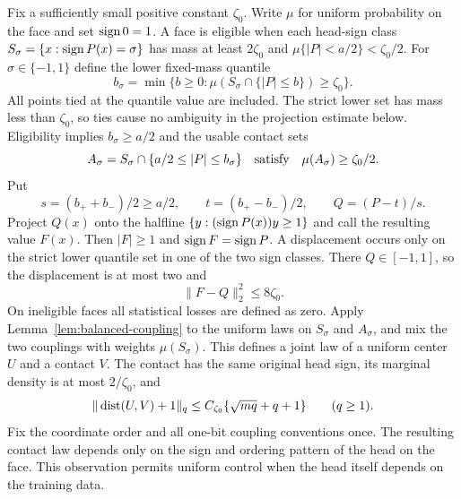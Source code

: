 Fix a sufficiently small positive constant $\zeta_0$.
Write $\mu$ for uniform probability on the face and set $\operatorname{sign}0=1$.
A face is eligible when each head-sign class
$S_\sigma=\{x:\operatorname{sign} P(x)=\sigma\}$ has mass at least $2\zeta_0$ and
$\mu\{|P|<a/2\}<\zeta_0/2$.
For $\sigma\in\{-1,1\}$ define the lower fixed-mass quantile
\[
 b_\sigma=\min\{b\ge0:\mu(S_\sigma\cap\{|P|\le b\})\ge\zeta_0\}.
\]
All points tied at the quantile value are included. The strict lower set
has mass less than $\zeta_0$, so ties cause no ambiguity in the projection
estimate below. Eligibility implies $b_\sigma\ge a/2$ and the usable
contact sets
\[
 A_\sigma=S_\sigma\cap\{a/2\le|P|\le b_\sigma\}
 \quad\hbox{satisfy}\quad\mu(A_\sigma)\ge\zeta_0/2.
\]
Put
\[
 s=(b_++b_-)/2\ge a/2,\qquad t=(b_+-b_-)/2,\qquad Q=(P-t)/s.
\]
Project $Q(x)$ onto the halfline $\{y:(\operatorname{sign} P(x))y\ge1\}$ and call
the resulting value $F(x)$. Then $|F|\ge1$ and $\operatorname{sign} F=\operatorname{sign} P$.
A displacement occurs only on the strict lower quantile set in one of
the two sign classes. There $Q\in[-1,1]$, so the displacement is at most
two and
\begin{equation}\label{eq:contact-projection-leakage}
 \|F-Q\|_2^2\le8\zeta_0.
\end{equation}
On ineligible faces all statistical losses are defined as zero.
Apply Lemma~\ref{lem:balanced-coupling} to the uniform laws on
$S_\sigma$ and $A_\sigma$, and mix the two couplings with weights $\mu(S_\sigma)$.
This defines a joint law of a uniform center $U$ and a contact $V$.
The contact has the same original head sign, its marginal density is
at most $2/\zeta_0$, and
\begin{equation}\label{eq:contact-distance-moments}
 \|\operatorname{dist}(U,V)+1\|_q
 \le C_{\zeta_0}\{\sqrt{mq}+q+1\}\qquad(q\ge1).
\end{equation}
Fix the coordinate order and all one-bit coupling conventions once.
The resulting contact law depends only on the sign and ordering
pattern of the head on the face. This observation permits uniform
control when the head itself depends on the training data.

